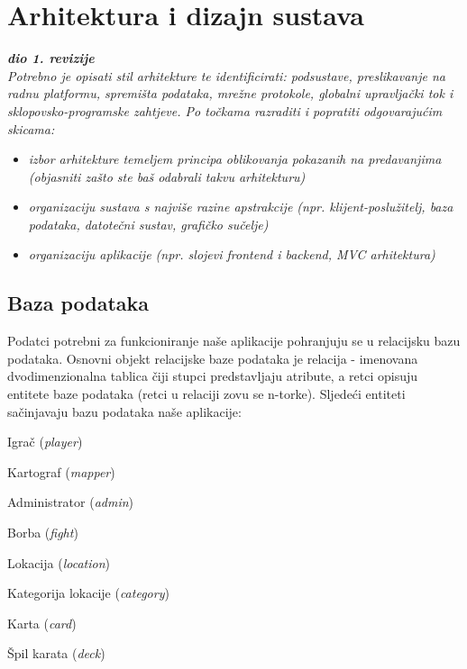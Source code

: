 \chapter{Arhitektura i dizajn sustava}
		
		\textbf{\textit{dio 1. revizije}}\\

		\textit{ Potrebno je opisati stil arhitekture te identificirati: podsustave, preslikavanje na radnu platformu, spremišta podataka, mrežne protokole, globalni upravljački tok i sklopovsko-programske zahtjeve. Po točkama razraditi i popratiti odgovarajućim skicama:}
	\begin{itemize}
		\item 	\textit{izbor arhitekture temeljem principa oblikovanja pokazanih na predavanjima (objasniti zašto ste baš odabrali takvu arhitekturu)}
		\item 	\textit{organizaciju sustava s najviše razine apstrakcije (npr. klijent-poslužitelj, baza podataka, datotečni sustav, grafičko sučelje)}
		\item 	\textit{organizaciju aplikacije (npr. slojevi frontend i backend, MVC arhitektura) }		
	\end{itemize}

	
		

		

				
		\section{Baza podataka}
			
			Podatci potrebni za funkcioniranje naše aplikacije pohranjuju se u relacijsku bazu podataka. Osnovni objekt relacijske baze podataka je relacija - imenovana dvodimenzionalna tablica čiji stupci predstavljaju atribute, a retci opisuju entitete baze podataka (retci u relaciji zovu se n-torke).
			Sljedeći entiteti sačinjavaju bazu podataka naše aplikacije:
			\begin{packed_item}
				\item Igrač (\textit{player})
				\item Kartograf (\textit{mapper})
				\item Administrator (\textit{admin})
				\item Borba (\textit{fight})
				\item Lokacija (\textit{location})
				\item Kategorija lokacije (\textit{category})
				\item Karta (\textit{card})
				\item Špil karata (\textit{deck})
			\end{packed_item}
			

